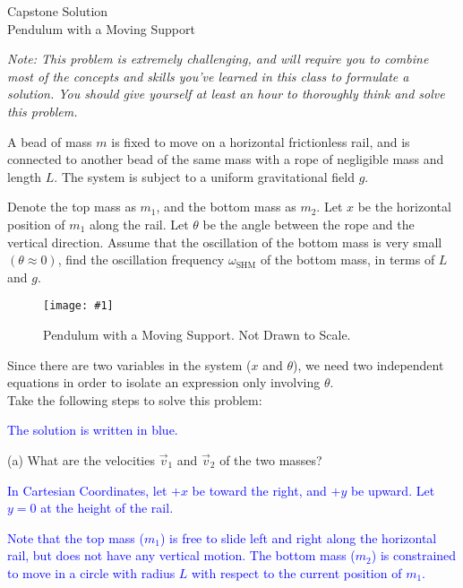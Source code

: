 \documentclass[11pt]{article}
\newcommand{\fig}[4]{
    \begin{figure}[H]
        \centering
        \texttt{[image: \#1]}
        \caption{#2}
        \label{exp4fit}
    \end{figure}
}
\theoremstyle{gangnamstyle}{\newtheorem{definition}{Definition}[]}
\theoremstyle{gangnamstyle}{\newtheorem{example}{Example}[]}
\theoremstyle{gangnamstyle}{\newtheorem{problem}{Problem}[]}
\begin{document}
\normalfont
\pagestyle{pages}


\begin{center}
\vspace{3in}
{\Large Capstone Solution } \\ [0.05in]
Pendulum with a Moving Support \\ [-0.5in]
\end{center}

\textit{Note: This problem is extremely challenging, and will require you to combine most of the concepts and skills you've learned in this class to formulate a solution. You should give yourself at least an hour to thoroughly think and solve this problem.} 

A bead of mass $m$ is fixed to move on a horizontal frictionless rail, and is connected to another bead of the same mass with a rope of negligible mass and length $L$. The system is subject to a uniform gravitational field $g$. 

Denote the top mass as $m_1$, and the bottom mass as $m_2$. Let $x$ be the horizontal position of $m_1$ along the rail. Let $\theta$ be the angle between the rope and the vertical direction. Assume that the oscillation of the bottom mass is very small $(\theta \approx 0)$, find the oscillation frequency $\omega_{\text{SHM}}$ of the bottom mass, in terms of $L$ and $g$. 

\fig{figs/caps/pendulum.png}{Pendulum with a Moving Support. Not Drawn to Scale.}{0.85}{0}

Since there are two variables in the system ($x$ and $\theta$), we need two independent equations in order to isolate an expression only involving $\theta$. \\
Take the following steps to solve this problem: 

\textcolor{blue}{The solution is written in blue. }

\pagebreak

(a) What are the velocities $\Vec{v}_{1}$ and $\Vec{v}_{2}$ of the two masses? 

\textcolor{blue}{In Cartesian Coordinates, let $+x$ be toward the right, and $+y$ be upward. Let $y = 0$ at the height of the rail. }

\textcolor{blue}{Note that the top mass ($m_1$) is free to slide left and right along the horizontal rail, but does not have any vertical motion. The bottom mass ($m_2$) is constrained to move in a circle with radius $L$ with respect to the current position of $m_1$. }
\end{document}
